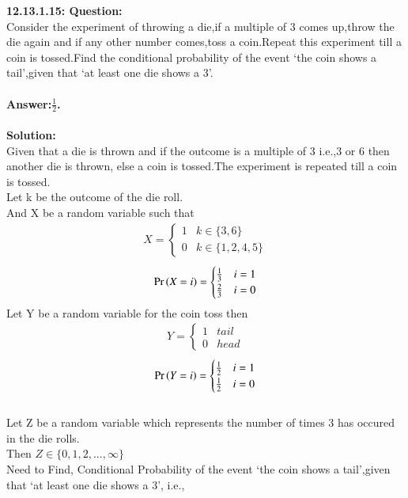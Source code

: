 \documentclass[journal,12pt,twocolumn]{IEEEtran}
\begin{document}
\textbf{12.13.1.15: Question:}\\
 	Consider the experiment of throwing a die,if a multiple of 3 comes up,throw the die again and if any other number comes,toss a coin.Repeat this experiment till a coin is tossed.Find the conditional probability of the event `the coin shows a tail',given that `at least one die shows a 3'.
\\\\
 \textbf{Answer:$\frac{1}{2}$.}\\
 \\
 \textbf{Solution:}
 \\
 Given that a die is thrown and if the outcome is a multiple of 3 i.e.,3 or 6 then another die is thrown, else a coin is tossed.The experiment is repeated till a coin is tossed.
 \\ Let k be the outcome of the die roll.
\\ And X be a random variable such that
\begin{align}
        X=  
        \begin{cases}
            1 & k \in \{3,6\} \\
            0 & k \in \{1,2,4,5\}
        \end{cases}
        \label{eq:ncert/12/13/1/15/pmf-X}
    \end{align}
\begin{align}
        \Pr\left(X=i\right) = 
        \begin{cases}
            \frac{1}{3} & i=1 \\
            \frac{2}{3} & i=0
        \end{cases}
        \label{eq:ncert/12/13/1/15/pmf-X}
    \end{align}
Let Y be a random variable for the coin toss then
\begin{align}
        Y=  
        \begin{cases}
            1 & tail \\
            0 & head
        \end{cases}
        \label{eq:ncert/12/13/1/15/pmf-X}
    \end{align}
\begin{align}
        \Pr\left(Y=i\right) = 
        \begin{cases}
            \frac{1}{2} & i=1 \\
            \frac{1}{2} & i=0
        \end{cases}
        \label{eq:ncert/12/13/1/15/pmf-X}
    \end{align} 
\\Let Z be a random variable which represents the number of times 3 has occured in the die rolls.
\\Then $Z \in \{0,1,2,...,\infty\} $
\\ Need to Find, Conditional Probability of the event `the coin shows a tail',given that `at least one die shows a 3', i.e., 
\end{document}
